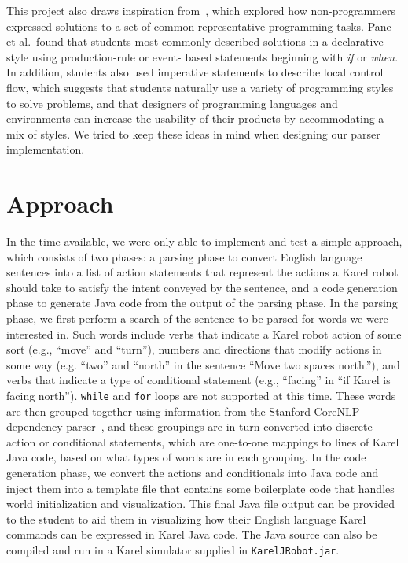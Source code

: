 \documentclass[11pt]{article}
\begin{document}
This project also draws inspiration from~, which explored how non-programmers
expressed solutions to a set of common representative programming tasks. Pane et al.\ found that
students most commonly described solutions in a declarative style using production-rule or event-
based statements beginning with \emph{if} or \emph{when}. In addition, students also used
imperative statements to describe local control flow, which suggests that students naturally use a
variety of programming styles to solve problems, and that designers of programming languages and
environments can increase the usability of their products by accommodating a mix of styles. We
tried to keep these ideas in mind when designing our parser implementation.

\section{Approach}
In the time available, we were only able to implement and test a simple approach, which consists of
two phases: a parsing phase to convert English language sentences into a list of action statements
that represent the actions a Karel robot should take to satisfy the intent conveyed by the
sentence, and a code generation phase to generate Java code from the output of the parsing phase.
In the parsing phase, we first perform a search of the sentence to be parsed for words we were
interested in. Such words include verbs that indicate a Karel robot action of some sort (e.g.,
``move'' and ``turn''), numbers and directions that modify actions in some way (e.g. ``two'' and
``north'' in the sentence ``Move two spaces north.''), and verbs that indicate a type of
conditional statement (e.g., ``facing'' in ``if Karel is facing north''). \texttt{while} and
\texttt{for} loops are not supported at this time. These words are then grouped together using
information from the Stanford CoreNLP dependency parser~\cite{Manning:2014aa}, and these groupings
are in turn converted into discrete action or conditional statements, which are one-to-one mappings
to lines of Karel Java code, based on what types of words are in each grouping. In the code
generation phase, we convert the actions and conditionals into Java code and inject them into a
template file that contains some boilerplate code that handles world initialization and
visualization. This final Java file output can be provided to the student to aid them in
visualizing how their English language Karel commands can be expressed in Karel Java code. The Java
source can also be compiled and run in a Karel simulator supplied in \texttt{KarelJRobot.jar}.
\end{document}
